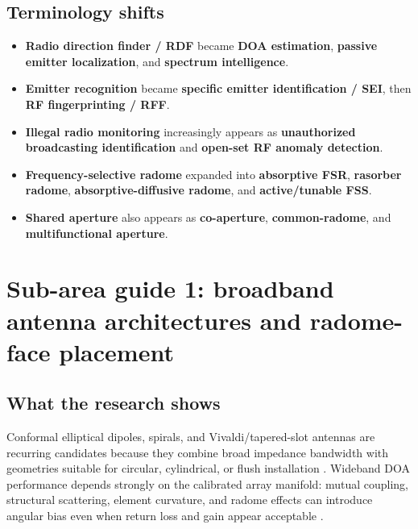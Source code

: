 \documentclass[
  10pt,
]{article}
\providecommand{\tightlist}{%
  \setlength{\itemsep}{0pt}\setlength{\parskip}{0pt}}
\begin{document}
\subsection{Terminology shifts}\label{terminology-shifts}

\begin{itemize}
\tightlist
\item
  \textbf{Radio direction finder / RDF} became \textbf{DOA estimation},
  \textbf{passive emitter localization}, and \textbf{spectrum
  intelligence}.
\item
  \textbf{Emitter recognition} became \textbf{specific emitter
  identification / SEI}, then \textbf{RF fingerprinting / RFF}.
\item
  \textbf{Illegal radio monitoring} increasingly appears as
  \textbf{unauthorized broadcasting identification} and \textbf{open-set
  RF anomaly detection}.
\item
  \textbf{Frequency-selective radome} expanded into \textbf{absorptive
  FSR}, \textbf{rasorber radome}, \textbf{absorptive-diffusive radome},
  and \textbf{active/tunable FSS}.
\item
  \textbf{Shared aperture} also appears as \textbf{co-aperture},
  \textbf{common-radome}, and \textbf{multifunctional aperture}.
\end{itemize}

\section{Sub-area guide 1: broadband antenna architectures and
radome-face
placement}\label{sub-area-guide-1-broadband-antenna-architectures-and-radome-face-placement}

\subsection{What the research shows}\label{what-the-research-shows}

Conformal elliptical dipoles, spirals, and Vivaldi/tapered-slot antennas
are recurring candidates because they combine broad impedance bandwidth
with geometries suitable for circular, cylindrical, or flush
installation
\citep{caratelli2011, gupta2023, liberal2011, pi2025, tianang2017}.
Wideband DOA performance depends strongly on the calibrated array
manifold: mutual coupling, structural scattering, element curvature, and
radome effects can introduce angular bias even when return loss and gain
appear acceptable \citep{caratelli2011, liberal2011}.
\end{document}
